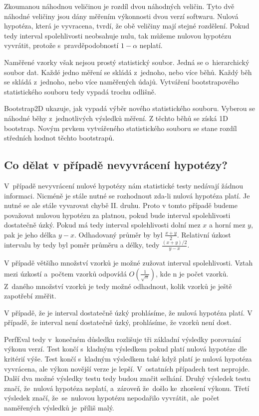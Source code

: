 Zkoumanou náhodnou veličinou je rozdíl dvou náhodných veličin. Tyto dvě náhodné veličiny jsou dány měřením
výkonnosti dvou verzí softwaru. Nulová hypotéza, která je vyvracena, tvrdí, že obě veličiny mají stejné rozdělení.
Pokud tedy interval spolehlivosti neobsahuje nulu, tak můžeme nulovou hypotézu vyvrátit, protože s~pravděpodobností
$1-\alpha$ neplatí.

Naměřené vzorky však nejsou prostý statistický soubor. Jedná se o~hierarchický soubor dat.
Každé jedno měření se skládá z~jednoho, nebo více běhů. Každý běh se skládá z~jednoho, nebo více naměřených údajů.
Vytváření bootstrapového statistického souboru tedy vypadá trochu odlišně.

Bootstrap2D ukazuje, jak vypadá výběr nového statistického souboru. Vyberou
se náhodné běhy z~jednotlivých výsledků měření. Z těchto běhů se získá 1D bootstrap.
Novým prvkem vytvářeného statistického souboru se stane rozdíl středních hodnot těchto bootstrapů.

\subsection{Co dělat v případě nevyvrácení hypotézy?}

V~případě nevyvrácení nulové hypotézy nám statistické testy nedávají žádnou informaci.
Nicméně je stále nutné se rozhodnout zda-li nulová hypotéza platí. Je nutné se ale stále
vyvarovat chybě II. druhu. Proto v tomto případě budeme považovat nulovou hypotézu za platnou,
pokud bude interval spolehlivosti dostatečně úzký. Pokud má tedy interval spolehlivosti
dolní mez $x$ a horní mez $y$, pak je jeho délka $y-x$. Odhadovaný průměr by byl $\frac{x+y}{2}$.
Relativní úzkost intervalu by tedy byl poměr průměru a délky, tedy $\frac{(x+y)/2}{y-x}$.

V případě většího množství vzorků je možné zužovat interval spolehlivosti. Vztah mezi
úzkostí a~počtem vzorků odpovídá $O(\frac{1}{\sqrt{n}})$, kde n je počet vzorků. Z~daného
množství vzorků je tedy možné odhadnout, kolik vzorků je ještě zapotřebí změřit.

V případě, že je interval dostatečně úzký prohlásíme, že nulová hypotéza platí.
V případě, že interval není dostatečně úzký, prohlásíme, že vzorků není dost.

PerfEval tedy v~konečném důsledku rozlišuje tři základní výsledky porovnání výkonu verzí.
Test končí s~kladným výsledkem pokud platí nulová hypotéze dle kritérií výše. Test
končí s~kladným výsledkem také když platí je nulová hypotéza vyvrácena, ale výkon novější verze je lepší.
V~ostatních případech test neprojde. Další dva možné výsledky testu tedy budou značit selhání.
Druhý výsledek testu značí, že~nulová hypotéza neplatí, a~zároveň že~došlo ke~zhoršení výkonu.
Třetí výsledek značí, že~se~nulovou hypotézu nepodařilo vyvrátit, ale~počet naměřených výsledků
je~příliš malý.

